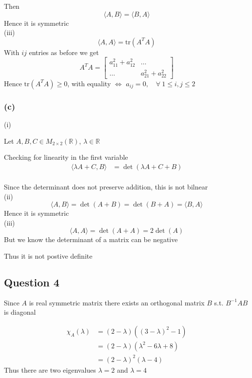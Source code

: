 \documentclass{article}
\begin{document}
Then
\[
\langle A,B \rangle = \langle B,A \rangle
\]
Hence it is symmetric
\\

(iii)
\[
\langle A,A \rangle = \mathrm{tr}(A^TA)
\]
With \(ij\) entries as before we get
\[
A^TA = \begin{bmatrix}
    a_{11}^2 + a_{12}^2 & \dots \\
    \dots & a_{21}^2 + a_{22}^2
\end{bmatrix}
\]
Hence \(\mathrm{tr}(A^TA) \geq 0\), with equality \(\iff\) \(a_{ij} = 0 , \quad \forall \ 1 \leq i,j \leq 2\)

\subsubsection*{(c)}
(i)

Let \(A,B,C \in M_{2\times 2}(\mathbb{R})\), \(\lambda \in \mathbb{R}\)

Checking for linearity in the first variable
\begin{align*}
    \langle \lambda A + C, B \rangle &= \det(\lambda A + C + B) \\
\end{align*}

Since the determinant does not preserve addition, this is not bilnear
\\

(ii)
\[
\langle A,B \rangle = \det(A+B) = \det(B+A) = \langle B,A \rangle
\]
Hence it is symmetric
\\

(iii)
\[
\langle A,A \rangle = \det(A+A) = 2\det(A)
\]
But we know the determinant of a matrix can be negative

Thus it is not postive definite










\subsection*{Question 4}
Since \(A\) is real symmetric matrix there exists an orthogonal matrix \(B\) s.t.
\(B^{-1} AB \) is diagonal

\begin{align*}
    \chi_A(\lambda) &= (2-\lambda)((3-\lambda)^2 - 1) \\
    &= (2-\lambda)(\lambda^2 -6\lambda + 8) \\
    &= (2-\lambda)^2(\lambda -4)
\end{align*}
Thus there are two eigenvalues \(\lambda = 2\) and \(\lambda = 4\)
\end{document}
